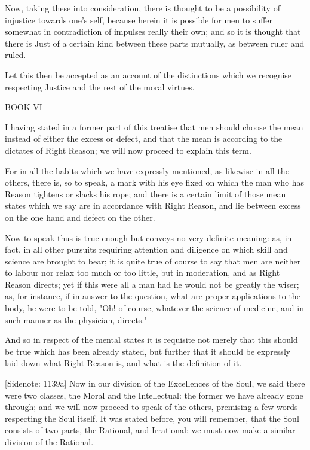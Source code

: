 Now, taking these into consideration, there is thought to be a
possibility of injustice towards one's self, because herein it is
possible for men to suffer somewhat in contradiction of impulses really
their own; and so it is thought that there is Just of a certain kind
between these parts mutually, as between ruler and ruled.

Let this then be accepted as an account of the distinctions which we
recognise respecting Justice and the rest of the moral virtues.




BOOK VI


I having stated in a former part of this treatise that men should choose
the mean instead of either the excess or defect, and that the mean
is according to the dictates of Right Reason; we will now proceed to
explain this term.

For in all the habits which we have expressly mentioned, as likewise
in all the others, there is, so to speak, a mark with his eye fixed on
which the man who has Reason tightens or slacks his rope; and there is a
certain limit of those mean states which we say are in accordance with
Right Reason, and lie between excess on the one hand and defect on the
other.

Now to speak thus is true enough but conveys no very definite meaning:
as, in fact, in all other pursuits requiring attention and diligence on
which skill and science are brought to bear; it is quite true of course
to say that men are neither to labour nor relax too much or too little,
but in moderation, and as Right Reason directs; yet if this were all
a man had he would not be greatly the wiser; as, for instance, if in
answer to the question, what are proper applications to the body, he
were to be told, "Oh! of course, whatever the science of medicine, and
in such manner as the physician, directs."

And so in respect of the mental states it is requisite not merely that
this should be true which has been already stated, but further that it
should be expressly laid down what Right Reason is, and what is the
definition of it.

[Sidenote: 1139a] Now in our division of the Excellences of the Soul, we
said there were two classes, the Moral and the Intellectual: the former
we have already gone through; and we will now proceed to speak of the
others, premising a few words respecting the Soul itself. It was
stated before, you will remember, that the Soul consists of two parts,
the Rational, and Irrational: we must now make a similar division of the
Rational.

